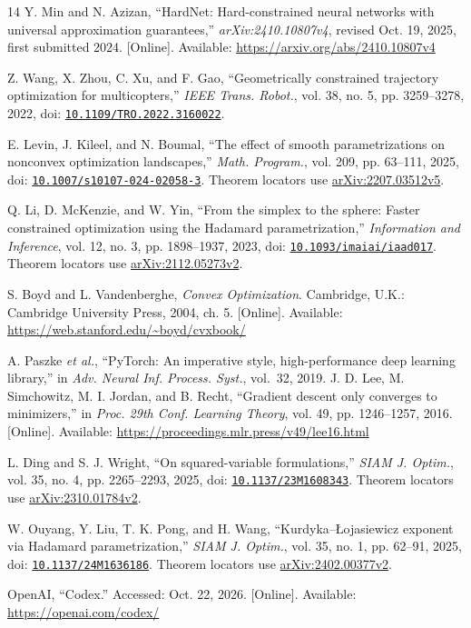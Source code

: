 \begin{thebibliography}{14}
 Y. Min and N. Azizan, ``HardNet: Hard-constrained neural networks with universal approximation guarantees,'' \emph{arXiv:2410.10807v4}, revised Oct. 19, 2025, first submitted 2024. [Online]. Available: \url{https://arxiv.org/abs/2410.10807v4}

 Z. Wang, X. Zhou, C. Xu, and F. Gao, ``Geometrically constrained trajectory optimization for multicopters,'' \emph{IEEE Trans. Robot.}, vol. 38, no. 5, pp. 3259--3278, 2022, doi: \href{https://doi.org/10.1109/TRO.2022.3160022}{\nolinkurl{10.1109/TRO.2022.3160022}}.

 E. Levin, J. Kileel, and N. Boumal, ``The effect of smooth parametrizations on nonconvex optimization landscapes,'' \emph{Math. Program.}, vol. 209, pp. 63--111, 2025, doi: \href{https://doi.org/10.1007/s10107-024-02058-3}{\nolinkurl{10.1007/s10107-024-02058-3}}. Theorem locators use \href{https://arxiv.org/abs/2207.03512v5}{arXiv:2207.03512v5}.

 Q. Li, D. McKenzie, and W. Yin, ``From the simplex to the sphere: Faster constrained optimization using the Hadamard parametrization,'' \emph{Information and Inference}, vol. 12, no. 3, pp. 1898--1937, 2023, doi: \href{https://doi.org/10.1093/imaiai/iaad017}{\nolinkurl{10.1093/imaiai/iaad017}}. Theorem locators use \href{https://arxiv.org/abs/2112.05273v2}{arXiv:2112.05273v2}.

 S. Boyd and L. Vandenberghe, \emph{Convex Optimization}. Cambridge, U.K.: Cambridge University Press, 2004, ch. 5. [Online]. Available: \url{https://web.stanford.edu/~boyd/cvxbook/}

A. Paszke \emph{et al.}, ``PyTorch: An imperative style, high-performance deep learning library,'' in \emph{Adv. Neural Inf. Process. Syst.}, vol.~32, 2019.
 J. D. Lee, M. Simchowitz, M. I. Jordan, and B. Recht, ``Gradient descent only converges to minimizers,'' in \emph{Proc. 29th Conf. Learning Theory}, vol. 49, pp. 1246--1257, 2016. [Online]. Available: \url{https://proceedings.mlr.press/v49/lee16.html}

 L. Ding and S. J. Wright, ``On squared-variable formulations,'' \emph{SIAM J. Optim.}, vol. 35, no. 4, pp. 2265--2293, 2025, doi: \href{https://doi.org/10.1137/23M1608343}{\nolinkurl{10.1137/23M1608343}}. Theorem locators use \href{https://arxiv.org/abs/2310.01784v2}{arXiv:2310.01784v2}.

 W. Ouyang, Y. Liu, T. K. Pong, and H. Wang, ``Kurdyka--\L{}ojasiewicz exponent via Hadamard parametrization,'' \emph{SIAM J. Optim.}, vol. 35, no. 1, pp. 62--91, 2025, doi: \href{https://doi.org/10.1137/24M1636186}{\nolinkurl{10.1137/24M1636186}}. Theorem locators use \href{https://arxiv.org/abs/2402.00377v2}{arXiv:2402.00377v2}.

 OpenAI, ``Codex.'' Accessed: Oct. 22, 2026. [Online]. Available: \url{https://openai.com/codex/}

\end{thebibliography}
